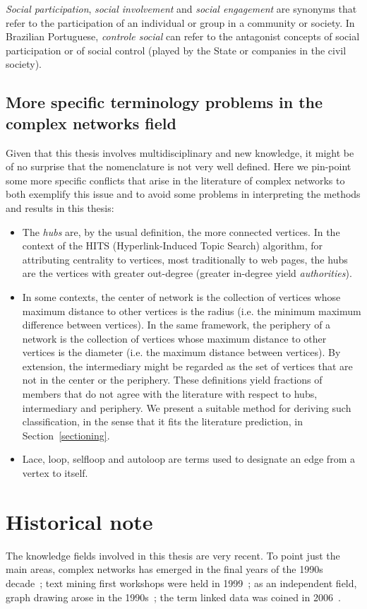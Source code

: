 \emph{Social participation}, \emph{social involvement} and \emph{social engagement} are synonyms that
refer to the participation of an individual or group in a community or society.
In Brazilian Portuguese, \emph{controle social} can refer to the antagonist concepts of social participation
or of social control (played by the State or companies in the civil society).

\subsection{More specific terminology problems in the complex networks field}
Given that this thesis involves multidisciplinary and new knowledge,
it might be of no surprise that the nomenclature is not very well defined.
Here we pin-point some more specific conflicts that arise in the literature of complex networks
to both exemplify this issue and to avoid some problems in interpreting the
methods and results in this thesis:


\begin{itemize}
\item The \emph{hubs} are, by the usual definition, the more connected vertices.
In the context of the HITS (Hyperlink-Induced Topic Search) algorithm,
for attributing centrality to vertices, most traditionally to web pages,
the hubs are the vertices with greater out-degree
(greater in-degree yield \emph{authorities}).
\item In some contexts, the center of network is the collection of vertices whose 
maximum distance to other vertices is the radius (i.e. the minimum maximum difference between vertices). 
In the same framework, the periphery of a network is the collection of vertices whose
maximum distance to other vertices is the diameter (i.e. the maximum distance between vertices).
By extension, the intermediary might be regarded as the set of vertices that are not in the center or the periphery.
These definitions yield fractions of members that do not agree with the literature with respect to hubs, intermediary and periphery.
We present a suitable method for deriving such classification, in the sense that it fits the literature prediction, in Section~\ref{sectioning}.
\item Lace, loop, selfloop and autoloop are terms used to designate an edge from a vertex to itself.
\end{itemize}

\section{Historical note}
The knowledge fields involved in this thesis are very recent.
To point just the main areas,
complex networks has emerged in the final years of the 1990s decade~\cite{newmanBook};
text mining first workshops were held in 1999~\cite{textMining};
as an independent field, graph drawing arose in the 1990s~\cite{dynGraph};
the term linked data was coined in 2006~\cite{lee1}.

